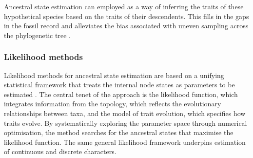 \documentclass[titlepage]{article}
\begin{document}
Ancestral state estimation can employed as a way of inferring the traits of these hypothetical species based on the traits of their descendents.
This fills in the gaps in the fossil record and alleviates the bias associated with uneven sampling across the phylogenetic tree \citep{friedman2009ecomorphological, brusatte2011phylogenetic}. 











\subsubsection{Likelihood methods}
Likelihood methods for ancestral state estimation are based on a unifying statistical framework that treats the internal node states as parameters to be estimated \citep{joy2016ancestral}.
The central tenet of the approach is the likelihood function, which integrates information from the topology, which reflects the evolutionary relationships between taxa, and the model of trait evolution, which specifies how traits evolve. 
By systematically exploring the parameter space through numerical optimisation, the method searches for the ancestral states that maximise the likelihood function.
The same general likelihood framework underpins estimation of continuous and discrete characters.
\end{document}
